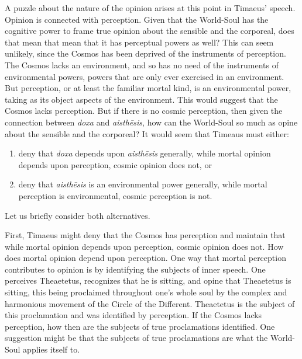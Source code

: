 A puzzle about the nature of the opinion arises at this point in Timaeus' speech. Opinion is connected with perception. Given that the World-Soul has the cognitive power to frame true opinion about the sensible and the corporeal, does that mean that mean that it has perceptual powers as well? This can seem unlikely, since the Cosmos has been deprived of the instruments of perception. The Cosmos lacks an environment, and so has no need of the instruments of environmental powers, powers that are only ever exercised in an environment. But perception, or at least the familiar mortal kind, is an environmental power, taking as its object aspects of the environment. This would suggest that the Cosmos lacks perception. But if there is no cosmic perception, then given the connection between \emph{doxa} and \emph{aisthēsis}, how can the World-Soul so much as opine about the sensible and the corporeal? It would seem that Timeaus must either:
\begin{enumerate}[(1)]
	\item deny that \emph{doxa} depends upon \emph{aisthēsis} generally, while mortal opinion depends upon perception, cosmic opinion does not, or
	\item deny that \emph{aisthēsis} is an environmental power generally, while mortal perception is environmental, cosmic perception is not. 
\end{enumerate}

Let us briefly consider both alternatives.

First, Timaeus might deny that the Cosmos has perception and maintain that while mortal opinion depends upon perception, cosmic opinion does not. How does mortal opinion depend upon perception. One way that mortal perception contributes to opinion is by identifying the subjects of inner speech. One perceives Theaetetus, recognizes that he is sitting, and opine that Theaetetus is sitting, this being proclaimed throughout one's whole soul by the complex and harmonious movement of the Circle of the Different. Theaetetus is the subject of this proclamation and was identified by perception. If the Cosmos lacks perception, how then are the subjects of true proclamations identified. One suggestion might be that the subjects of true proclamations are what the World-Soul applies itself to. 

